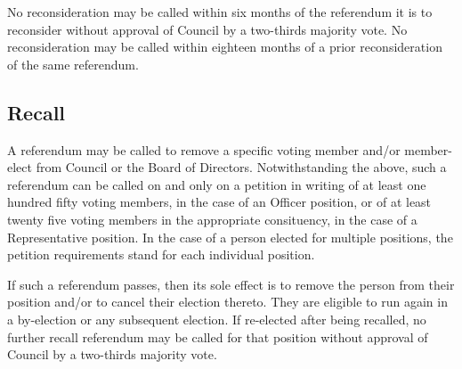 No reconsideration may be called within six months of the referendum it is to
reconsider without approval of Council by a two-thirds majority vote. No
reconsideration may be called within eighteen months of a prior reconsideration
of the same referendum.

\subsection{Recall}
A referendum may be called to remove a specific voting member and/or member-elect
from Council or the Board of Directors. Notwithstanding the above, such a
referendum can be called on and only on a petition in writing of at least one
hundred fifty voting members, in the case of an Officer position, or of at
least twenty five voting members in the appropriate consituency, in the case of
a Representative position. In the case of a person elected for multiple
positions, the petition requirements stand for each individual position.

If such a referendum passes, then its sole effect is to remove the person from
their position and/or to cancel their election thereto. They are
eligible to run again in a by-election or any subsequent election. If re-elected
after being recalled, no further recall referendum may be called for that
position without approval of Council by a two-thirds majority vote.
